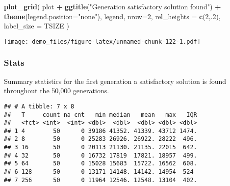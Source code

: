 \documentclass[]{book}
\newenvironment{Shaded}{\begin{snugshade}}{\end{snugshade}}
\newcommand{\DataTypeTok}[1]{\textcolor[rgb]{0.13,0.29,0.53}{#1}}
\newcommand{\DecValTok}[1]{\textcolor[rgb]{0.00,0.00,0.81}{#1}}
\newcommand{\KeywordTok}[1]{\textcolor[rgb]{0.13,0.29,0.53}{\textbf{#1}}}
\newcommand{\NormalTok}[1]{#1}
\newcommand{\OperatorTok}[1]{\textcolor[rgb]{0.81,0.36,0.00}{\textbf{#1}}}
\newcommand{\OtherTok}[1]{\textcolor[rgb]{0.56,0.35,0.01}{#1}}
\newcommand{\StringTok}[1]{\textcolor[rgb]{0.31,0.60,0.02}{#1}}
\begin{document}
\begin{Shaded}
\begin{Highlighting}[]
\KeywordTok{plot_grid}\NormalTok{(}
\NormalTok{  plot }\OperatorTok{+}
\StringTok{    }\KeywordTok{ggtitle}\NormalTok{(}\StringTok{"Generation satisfactory solution found"}\NormalTok{) }\OperatorTok{+}
\StringTok{    }\KeywordTok{theme}\NormalTok{(}\DataTypeTok{legend.position=}\StringTok{"none"}\NormalTok{),}
\NormalTok{  legend,}
  \DataTypeTok{nrow=}\DecValTok{2}\NormalTok{,}
  \DataTypeTok{rel_heights =} \KeywordTok{c}\NormalTok{(}\DecValTok{2}\NormalTok{,.}\DecValTok{2}\NormalTok{),}
  \DataTypeTok{label_size =}\NormalTok{ TSIZE}
\NormalTok{)}
\end{Highlighting}
\end{Shaded}

\texttt{[image: demo\_files/figure-latex/unnamed-chunk-122-1.pdf]}

\hypertarget{stats-22}{%
\subsubsection{Stats}\label{stats-22}}

Summary statistics for the first generation a satisfactory solution is found throughout the 50,000 generations.

\begin{Shaded}
\end{Shaded}

\begin{verbatim}
## # A tibble: 7 x 8
##   T     count na_cnt   min median   mean   max   IQR
##   <fct> <int>  <int> <dbl>  <dbl>  <dbl> <dbl> <dbl>
## 1 4        50      0 39186 41352. 41339. 43712 1474.
## 2 8        50      0 25283 26926. 26922. 28222  496.
## 3 16       50      0 20113 21130. 21135. 22015  642.
## 4 32       50      0 16732 17819  17821. 18957  499.
## 5 64       50      0 15028 15683  15722. 16562  608.
## 6 128      50      0 13171 14148. 14142. 14954  524 
## 7 256      50      0 11964 12546. 12548. 13104  402.
\end{verbatim}
\end{document}
